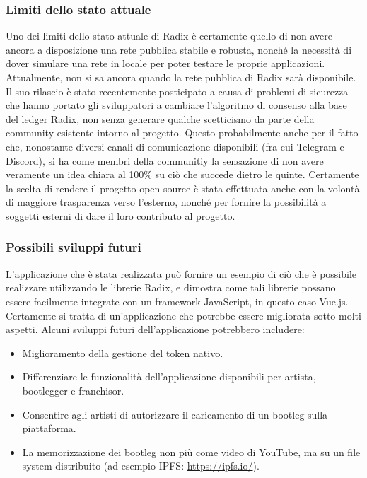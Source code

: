 \subsubsection{Limiti dello stato attuale}

Uno dei limiti dello stato attuale di Radix è certamente quello di non avere ancora a disposizione una rete pubblica stabile e robusta, nonché la necessità di dover simulare una rete in locale per poter testare le proprie applicazioni. Attualmente, non si sa ancora quando la rete pubblica di Radix sarà disponibile. Il suo rilascio è stato recentemente posticipato a causa di problemi di sicurezza che hanno portato gli sviluppatori a cambiare l'algoritmo di consenso alla base del ledger Radix, non senza generare qualche scetticismo da parte della community esistente intorno al progetto. Questo probabilmente anche per il fatto che, nonostante diversi canali di comunicazione disponibili (fra cui Telegram e Discord), si ha come membri della communitiy la sensazione di non avere veramente un idea chiara al 100\% su ciò che succede dietro le quinte. Certamente la scelta di rendere il progetto open source è stata effettuata anche con la volontà di maggiore trasparenza verso l'esterno, nonché per fornire la possibilità a soggetti esterni di dare il loro contributo al progetto.

\subsubsection{Possibili sviluppi futuri}

L'applicazione che è stata realizzata può fornire un esempio di ciò che è possibile realizzare utilizzando le librerie Radix, e dimostra come tali librerie possano essere facilmente integrate con un framework JavaScript, in questo caso Vue.js. Certamente si tratta di un'applicazione che potrebbe essere migliorata sotto molti aspetti. Alcuni sviluppi futuri dell'applicazione potrebbero includere:
\begin{itemize}
    \item Miglioramento della gestione del token nativo.
    \item Differenziare le funzionalità dell'applicazione disponibili per artista, bootlegger e franchisor.
    \item Consentire agli artisti di autorizzare il caricamento di un bootleg sulla piattaforma.
    \item La memorizzazione dei bootleg non più come video di YouTube, ma su un file system distribuito  (ad esempio IPFS: \url{https://ipfs.io/}).
\end{itemize}
